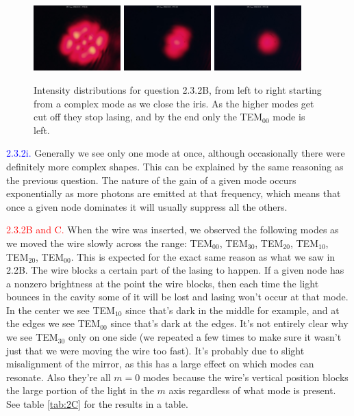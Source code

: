 \documentclass[letterpaper, reqno,11pt]{article}
\begin{document}
\begin{figure}[tb]
    \centering
    \includegraphics[width=0.3\textwidth]{data/2B/im_0229_20240301_175322.jpg}
    \includegraphics[width=0.3\textwidth]{data/2B/im_0227_20240301_175136.jpg}
    \includegraphics[width=0.3\textwidth]{data/2B/im_0228_20240301_175138.jpg}
    \caption{Intensity distributions for question 2.3.2B, from left to right starting from a complex mode as we close the iris. As the higher modes get cut off they stop lasing, and by the end only the TEM$_{00}$ mode is left.}
    \label{fig:2B}
\end{figure}

\noindent \textcolor{blue}{2.3.2i.} Generally we see only one mode at once, although occasionally there were definitely more complex shapes. This can be explained by the same reasoning as the previous question. The nature of the gain of a given mode occurs exponentially as more photons are emitted at that frequency, which means that once a given node dominates it will usually suppress all the others.

\noindent \textcolor{red}{2.3.2B and C.} When the wire was inserted, we observed the following modes as we moved the wire slowly across the range: TEM$_{00}$, TEM$_{30}$, TEM$_{20}$, TEM$_{10}$, TEM$_{20}$, TEM$_{00}$. This is expected for the exact same reason as what we saw in 2.2B. The wire blocks a certain part of the lasing to happen. If a given node has a nonzero brightness at the point the wire blocks, then each time the light bounces in the cavity some of it will be lost and lasing won't occur at that mode. In the center we see TEM$_{10}$ since that's dark in the middle for example, and at the edges we see TEM$_{00}$ since that's dark at the edges. It's not entirely clear why we see TEM$_{30}$ only on one side (we repeated a few times to make sure it wasn't just that we were moving the wire too fast). It's probably due to slight misalignment of the mirror, as this has a large effect on which modes can resonate. Also they're all $m=0$ modes because the wire's vertical position blocks the large portion of the light in the $m$ axis regardless of what mode is present. See table \ref{tab:2C} for the results in a table.
\end{document}
